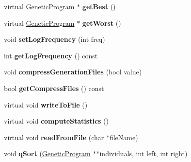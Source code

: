 \begin{DoxyCompactItemize}
virtual \hyperlink{classGeneticProgram}{Genetic\+Program} $\ast$ {\bfseries get\+Best} ()
\item 
\hypertarget{classPopulation_af5ac94068bc2aa35b73c57d52f9e1867}{}\label{classPopulation_af5ac94068bc2aa35b73c57d52f9e1867} 
virtual \hyperlink{classGeneticProgram}{Genetic\+Program} $\ast$ {\bfseries get\+Worst} ()
\item 
\hypertarget{classPopulation_a93466941f5e075ab658295bf50c06eff}{}\label{classPopulation_a93466941f5e075ab658295bf50c06eff} 
void {\bfseries set\+Log\+Frequency} (int freq)
\item 
\hypertarget{classPopulation_ac7b41790d3a87aff85d6d25451b829bc}{}\label{classPopulation_ac7b41790d3a87aff85d6d25451b829bc} 
int {\bfseries get\+Log\+Frequency} () const
\item 
\hypertarget{classPopulation_a3485142204a414f2630eaaf2341efc61}{}\label{classPopulation_a3485142204a414f2630eaaf2341efc61} 
void {\bfseries compress\+Generation\+Files} (bool value)
\item 
\hypertarget{classPopulation_a3e7ceab5e911b2a30308df34e5f8cf6d}{}\label{classPopulation_a3e7ceab5e911b2a30308df34e5f8cf6d} 
bool {\bfseries get\+Compress\+Files} () const
\item 
\hypertarget{classPopulation_a368a1add601bc972b7609ec25907ca4a}{}\label{classPopulation_a368a1add601bc972b7609ec25907ca4a} 
virtual void {\bfseries write\+To\+File} ()
\item 
\hypertarget{classPopulation_a9beb1df411e9adf8498110f5442f9884}{}\label{classPopulation_a9beb1df411e9adf8498110f5442f9884} 
virtual void {\bfseries compute\+Statistics} ()
\item 
\hypertarget{classPopulation_ad5ac00644614fa50b92f6c88ee0fc236}{}\label{classPopulation_ad5ac00644614fa50b92f6c88ee0fc236} 
virtual void {\bfseries read\+From\+File} (char $\ast$file\+Name)
\item 
\hypertarget{classPopulation_a886082aaf6dfee2fd7b4a3160b5d3bd0}{}\label{classPopulation_a886082aaf6dfee2fd7b4a3160b5d3bd0} 
void {\bfseries q\+Sort} (\hyperlink{classGeneticProgram}{Genetic\+Program} $\ast$$\ast$individuals, int left, int right)
\end{DoxyCompactItemize}
